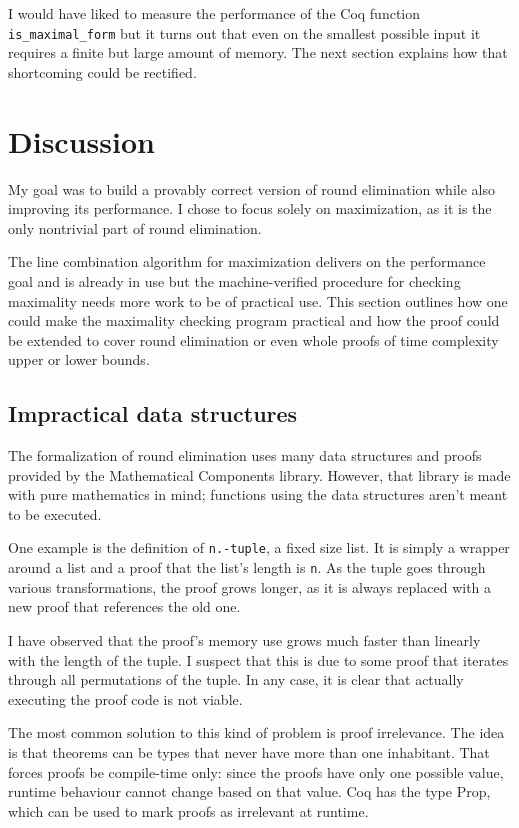 \documentclass[english, 12pt, a4paper, sci, a-1b, online]{aaltothesis}
\newcommand\icoq[1]{\texttt{#1}}
\begin{document}
I would have liked to measure the performance of the Coq function \icoq{is_maximal_form} but it turns out that even on the smallest possible input it requires a finite but large amount of memory. The next section explains how that shortcoming could be rectified.


\section{Discussion}

My goal was to build a provably correct version of round elimination while also improving its performance. I chose to focus solely on maximization, as it is the only nontrivial part of round elimination.

The line combination algorithm for maximization delivers on the performance goal and is already in use but the machine-verified procedure for checking maximality needs more work to be of practical use. This section outlines how one could make the maximality checking program practical and how the proof could be extended to cover round elimination or even whole proofs of time complexity upper or lower bounds.

\subsection{Impractical data structures}\label{badds}

The formalization of round elimination uses many data structures and proofs provided by the Mathematical Components library. However, that library is made with pure mathematics in mind; functions using the data structures aren't meant to be executed.

One example is the definition of \icoq{n.-tuple}, a fixed size list. It is simply a wrapper around a list and a proof that the list's length is \icoq{n}. As the tuple goes through various transformations, the proof grows longer, as it is always replaced with a new proof that references the old one.

I have observed that the proof's memory use grows much faster than linearly with the length of the tuple. I suspect that this is due to some proof that iterates through all permutations of the tuple. In any case, it is clear that actually executing the proof code is not viable.

The most common solution to this kind of problem is proof irrelevance. The idea is that theorems can be types that never have more than one inhabitant. That forces proofs be compile-time only: since the proofs have only one possible value, runtime behaviour cannot change based on that value. Coq has the type Prop, which can be used to mark proofs as irrelevant at runtime.
\end{document}
